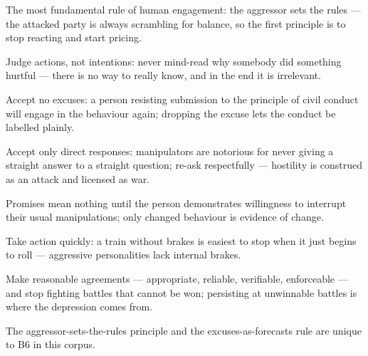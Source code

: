 

\begin{distilled}
  \item The most fundamental rule of human engagement: the aggressor sets the rules --- the attacked party is always scrambling for balance, so the first principle is to stop reacting and start pricing.
  \item Judge actions, not intentions: never mind-read why somebody did something hurtful --- there is no way to really know, and in the end it is irrelevant.
  \item Accept no excuses: a person resisting submission to the principle of civil conduct will engage in the behaviour again; dropping the excuse lets the conduct be labelled plainly.
  \item Accept only direct responses: manipulators are notorious for never giving a straight answer to a straight question; re-ask respectfully --- hostility is construed as an attack and licensed as war.
  \item Promises mean nothing until the person demonstrates willingness to interrupt their usual manipulations; only changed behaviour is evidence of change.
  \item Take action quickly: a train without brakes is easiest to stop when it just begins to roll --- aggressive personalities lack internal brakes.
  \item Make reasonable agreements --- appropriate, reliable, verifiable, enforceable --- and stop fighting battles that cannot be won; persisting at unwinnable battles is where the depression comes from.
\end{distilled}
\begin{unique}
  \item The aggressor-sets-the-rules principle and the excuses-as-forecasts rule are unique to B6 in this corpus.
\end{unique}
